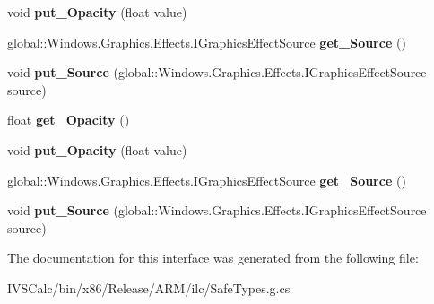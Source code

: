 \begin{DoxyCompactItemize}
void {\bfseries put\+\_\+\+Opacity} (float value)
\item 
\mbox{\label{interface_microsoft_1_1_graphics_1_1_canvas_1_1_effects_1_1_i_opacity_effect_a77e279b93897a71f5fc330abc90056d4}} 
global\+::\+Windows.\+Graphics.\+Effects.\+I\+Graphics\+Effect\+Source {\bfseries get\+\_\+\+Source} ()
\item 
\mbox{\label{interface_microsoft_1_1_graphics_1_1_canvas_1_1_effects_1_1_i_opacity_effect_a9ea7803e3e9d075e3baa03719edd7a57}} 
void {\bfseries put\+\_\+\+Source} (global\+::\+Windows.\+Graphics.\+Effects.\+I\+Graphics\+Effect\+Source source)
\item 
\mbox{\label{interface_microsoft_1_1_graphics_1_1_canvas_1_1_effects_1_1_i_opacity_effect_a5b292a8b09cbc683fee56e57c5fb9e50}} 
float {\bfseries get\+\_\+\+Opacity} ()
\item 
\mbox{\label{interface_microsoft_1_1_graphics_1_1_canvas_1_1_effects_1_1_i_opacity_effect_a869c5377258508b0dc30e395346a3315}} 
void {\bfseries put\+\_\+\+Opacity} (float value)
\item 
\mbox{\label{interface_microsoft_1_1_graphics_1_1_canvas_1_1_effects_1_1_i_opacity_effect_a77e279b93897a71f5fc330abc90056d4}} 
global\+::\+Windows.\+Graphics.\+Effects.\+I\+Graphics\+Effect\+Source {\bfseries get\+\_\+\+Source} ()
\item 
\mbox{\label{interface_microsoft_1_1_graphics_1_1_canvas_1_1_effects_1_1_i_opacity_effect_a9ea7803e3e9d075e3baa03719edd7a57}} 
void {\bfseries put\+\_\+\+Source} (global\+::\+Windows.\+Graphics.\+Effects.\+I\+Graphics\+Effect\+Source source)
\end{DoxyCompactItemize}


The documentation for this interface was generated from the following file\+:\begin{DoxyCompactItemize}
\item 
I\+V\+S\+Calc/bin/x86/\+Release/\+A\+R\+M/ilc/Safe\+Types.\+g.\+cs\end{DoxyCompactItemize}
